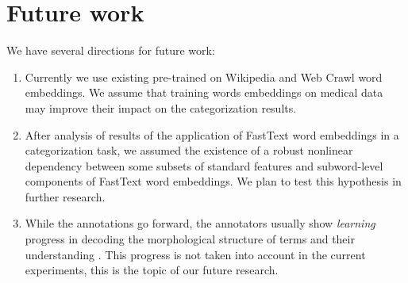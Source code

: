 \section{Future work}
We have several directions for future work:
\begin{enumerate}
    \item Currently we use existing pre-trained on Wikipedia and Web Crawl word embeddings. We assume that training words embeddings on medical data may improve their impact on the categorization results.
    
    \item After analysis of results of the application of FastText word embeddings in a categorization task, we assumed the existence of a robust nonlinear dependency between some subsets of standard features and subword-level components of FastText word embeddings. We plan to test this hypothesis in further research.
    
    \item While the annotations go forward, the annotators usually show {\it learning} progress in decoding the morphological structure of terms and their understanding \citep{Grabar-BIONLP2017}. This progress is not taken into account in the current experiments, this is the topic of our future research. 
\end{enumerate}

